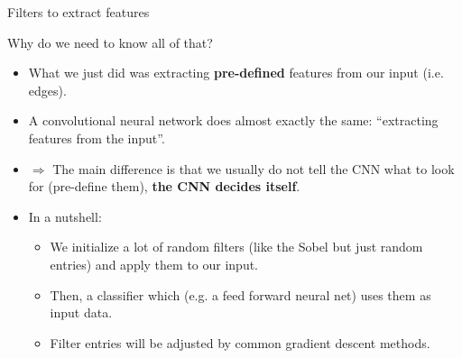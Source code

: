 \begin{frame}{Filters to extract features}
    \begin{itemize}

\end{itemize}
\end{frame}

\begin{vbframe}{Why do we need to know all of that?}
  \begin{itemize}
    \item What we just did was extracting \textbf{pre-defined} features from our input (i.e. edges).
    \item A convolutional neural network does almost exactly the same: \enquote{extracting features from the input}.
    \item[] $\Rightarrow$ The main difference is that we usually do not tell the CNN what to look for (pre-define them), \textbf{the CNN decides itself}.
    \item In a nutshell:
    \begin{itemize}
      \item We initialize a lot of random filters (like the Sobel but just random entries) and apply them to our input.
      \item Then, a classifier which (e.g. a feed forward neural net) uses them as input data.
      \item Filter entries will be adjusted by common gradient descent methods.
    \end{itemize}
  \end{itemize}
\end{vbframe}

